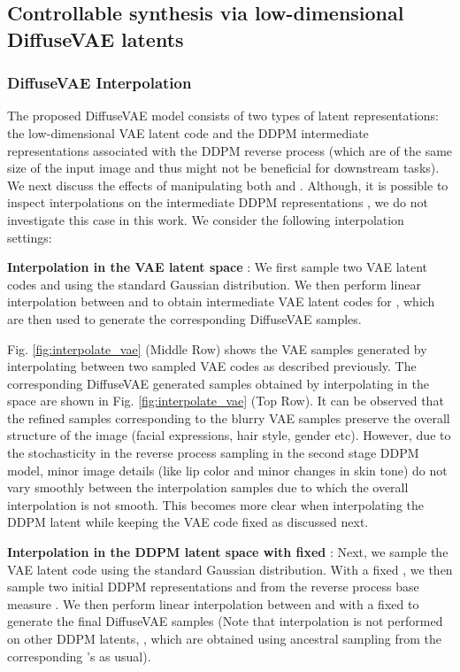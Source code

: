 \documentclass[10pt]{article} \usepackage[accepted]{tmlr}
\begin{document}
\subsection{Controllable synthesis via low-dimensional DiffuseVAE latents}
\label{subsec:exp_controllable}

\noindent
\subsubsection{DiffuseVAE Interpolation}
The proposed DiffuseVAE model consists of two types of latent representations: the low-dimensional VAE latent code  and the DDPM intermediate representations  associated with the DDPM reverse process (which are of the same size of the input image  and thus might not be beneficial for downstream tasks). We next discuss the effects of manipulating both  and . Although, it is possible to inspect interpolations on the intermediate DDPM representations , we do not investigate this case in this work. We consider the following interpolation settings:

\textbf{Interpolation in the VAE latent space }: We first sample two VAE latent codes  and  using the standard Gaussian distribution. We then perform linear interpolation between  and  to obtain intermediate VAE latent codes  for , which are then used to generate the corresponding DiffuseVAE samples.

Fig. \ref{fig:interpolate_vae} (Middle Row) shows the VAE samples generated by interpolating between two sampled VAE codes as described previously. The corresponding DiffuseVAE generated samples obtained by interpolating in the   space are shown in Fig. \ref{fig:interpolate_vae} (Top Row). It can be observed that the refined samples corresponding to the blurry VAE samples preserve the overall structure of the image (facial expressions, hair style, gender etc). However, due to the stochasticity in the reverse process sampling in the second stage DDPM model, minor image details (like lip color and minor changes in skin tone) do not vary smoothly between the interpolation samples due to which the overall interpolation is not smooth. This becomes more clear when interpolating the DDPM latent  while keeping the VAE code  fixed as discussed next.

\textbf{Interpolation in the DDPM latent space with fixed }: Next, we sample the VAE latent code  using the standard Gaussian distribution. With a fixed , we then sample two initial DDPM representations  and  from the reverse process base measure . We then perform linear interpolation between  and  with a fixed  to generate the final DiffuseVAE samples (Note that interpolation is not performed on other DDPM latents, , which are obtained using ancestral sampling from the corresponding 's as usual).
\end{document}
